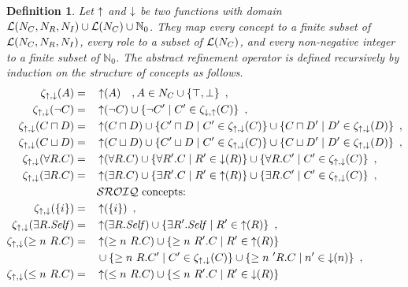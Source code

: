 \documentclass[
]{ceurart}
\newtheorem{definition}{Definition}
\begin{document}
\begin{definition}
  Let $\mathop{\uparrow}$ and $\mathop{\downarrow}$ be two functions with domain $\mathcal{L}(N_C, N_R, N_I) \cup \mathcal{L}(N_C) \cup \mathbb{N}_0$. They map every concept to a finite subset of $\mathcal{L}(N_C, N_R, N_I)$, every role to a subset of $\mathcal{L}(N_C)$, and every non-negative integer to a finite subset of $\mathbb{N}_0$.
  The \emph{abstract refinement operator} is defined recursively by induction on the structure of concepts as follows.
  {\footnotesize
  \begin{alignat*}{2}
    \zeta_{\refine,\corefine}(A) &= &&\refine(A) \quad, A \in N_C \cup \{\top, \bot\} \enspace, \\
    \zeta_{\refine,\corefine}(\lnot C) &= &&\refine(\lnot C) \cup \{ \lnot C' \mid C' \in \zeta_{\corefine,\refine}(C) \} \enspace, \\
    \zeta_{\refine,\corefine}(C \sqcap D) &= &&\refine(C \sqcap D) \cup \{ C' \sqcap D \mid C' \in \zeta_{\refine,\corefine}(C) \}
    \cup \{ C \sqcap D' \mid D' \in \zeta_{\refine,\corefine}(D) \} \enspace, \\
    \zeta_{\refine,\corefine}(C \sqcup D) &= &&\refine(C \sqcup D) \cup \{ C' \sqcup D \mid C' \in \zeta_{\refine,\corefine}(C) \}
    \cup \{ C \sqcup D' \mid D' \in \zeta_{\refine,\corefine}(D) \} \enspace, \\
    \zeta_{\refine,\corefine}(\forall R.C) &= &&\refine(\forall R.C) \cup \{ \forall R'.C \mid R' \in \corefine(R) \}
    \cup \{ \forall R.C' \mid C' \in \zeta_{\refine,\corefine}(C) \} \enspace, \\
    \zeta_{\refine,\corefine}(\exists R.C) &= &&\refine(\exists R.C) \cup \{ \exists R'.C \mid R' \in \refine(R) \}
    \cup \{ \exists R.C' \mid C' \in \zeta_{\refine,\corefine}(C) \} \enspace, \\
    &&& \text{\SROIQ concepts:} \\
    \zeta_{\refine,\corefine}(\nominal i) &= &&\refine(\nominal i) \enspace, \\
    \zeta_{\refine,\corefine}(\exists R.\self) &= &&\refine(\exists R.\self) \cup \{ \exists R'.\self \mid R' \in \refine(R) \} \enspace, \\
    \zeta_{\refine,\corefine}(\more n R.C) &= &&\refine(\more n R.C) \cup \{ \more n R'.C \mid R' \in \refine(R) \} \\
    &&& \cup \{ \more n R.C' \mid C' \in \zeta_{\refine,\corefine}(C) \}
    \cup \{ \more n' R.C \mid n' \in \corefine(n) \} \enspace, \\
    \zeta_{\refine,\corefine}(\less n R.C) &= &&\refine(\less n R.C) \cup \{ \less n R'.C \mid R' \in \corefine(R) \} \\

\end{alignat*}}
\end{definition}
\end{document}
